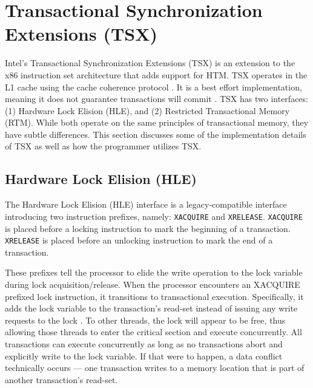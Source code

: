 \documentclass[11pt]{book}
\begin{document}
\section{Transactional Synchronization Extensions (TSX)}

Intel's Transactional Synchronization Extensions (TSX) is an extension to the x86
instruction set architecture that adds support for HTM.  TSX operates in the L1 cache
using the cache coherence protocol \cite{intel_opt_man}.  It is a best effort
implementation, meaning it does not guarantee transactions will commit
\cite{intel_prog_ref}.  TSX has two interfaces: (1) Hardware Lock Elision (HLE), and (2)
Restricted Transactional Memory (RTM).  While both operate on the same principles of
transactional memory, they have subtle differences.  This section discusses some of the
implementation details of TSX as well as how the programmer utilizes TSX.

\subsection{Hardware Lock Elision (HLE)}\label{sec:hle}


The Hardware Lock Elision (HLE) interface is a legacy-compatible interface introducing two
instruction prefixes, namely: \texttt{XACQUIRE} and \texttt{XRELEASE}.  \texttt{XACQUIRE}
is placed before a locking instruction to mark the beginning of a transaction.
\texttt{XRELEASE} is placed before an unlocking instruction to mark the end of a
transaction.

These prefixes tell the processor to elide the write operation to the lock variable during
lock acquisition/release.  When the processor encounters an XACQUIRE prefixed lock
instruction, it transitions to transactional execution.  Specifically, it adds the lock
variable to the transaction's read-set instead of issuing any write requests to the lock
\cite{intel_prog_ref}.  To other threads, the lock will appear to be free, thus allowing
those threads to enter the critical section and execute concurrently.  All transactions
can execute concurrently as long as no transactions abort and explicitly write to the
lock variable.  If that were to happen, a data conflict technically occurs --- one
transaction writes to a memory location that is part of another transaction's read-set.
\end{document}
